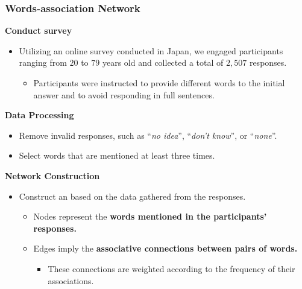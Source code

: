 \documentclass[
	aspectratio=169, %
	t, %
	onlytextwidth, %
	10pt, %
]{beamer}
\begin{document}
\begin{frame}
    \frametitle{Words-association Network}
    \textbf{Conduct survey}
    \begin{itemize}        
        \item  Utilizing an online survey conducted in Japan, we engaged participants ranging from $20$ to $79$ years old and collected a total of $2,507$ responses.
        \begin{itemize}
            \item Participants were instructed to provide different words to the initial answer and to avoid responding in full sentences.	
        \end{itemize}
        \end{itemize}
        \pause
        \textbf{Data Processing}
        \begin{itemize}
        \item Remove invalid responses, such as “\textit{no idea}”, “\textit{don't know}”, or “\textit{none}”.
        \item Select words that are mentioned at least three times.
        \end{itemize}
        \pause
        \textbf{Network Construction}
        \begin{itemize}
        \item  Construct an  based on the data gathered from the responses. 
        \begin{itemize}
            \item Nodes represent the \textbf{words mentioned in the participants’ responses.}
            \item Edges imply the \textbf{associative connections between pairs of words.}
            \begin{itemize}
                \item These connections are weighted according to the frequency of their associations.
            \end{itemize}
        \end{itemize}
    \end{itemize}

\end{frame}

\end{document}
